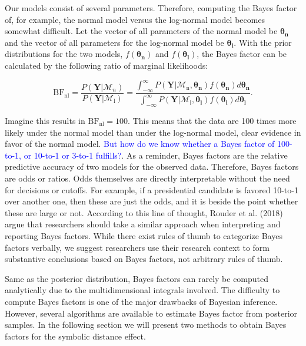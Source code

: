 \documentclass[
  english,
  doc,floatsintext]{apa6}
\begin{document}
Our models consist of several parameters. Therefore, computing the Bayes factor of, for example, the normal model versus the log-normal model becomes somewhat difficult. Let the vector of all parameters of the normal model be \(\bm{\theta_\text{n}}\) and the vector of all parameters for the log-normal model be \(\bm{\theta_{\text{l}}}\). With the prior distributions for the two models, \(f(\bm{\theta_\text{n}})\) and \(f(\bm{\theta_\text{l}})\), the Bayes factor can be calculated by the following ratio of marginal likelihoods:

\begin{equation}
\text{BF}_{\text{nl}} = \frac{P(\bm{Y} | \mathcal{M}_n)}{P(\bm{Y} | \mathcal{M}_{\text{l}})} = \frac{\int_{-\infty}^{\infty}P(\bm{Y} | \mathcal{M}_\text{n}, \bm{\theta_{\text{n}}})f(\bm{\theta_{\text{n}}})d\bm{\theta_{\text{n}}}}{\int_{-\infty}^{\infty}P(\bm{Y} | \mathcal{M}_\text{l}, \bm{\theta_{\text{l}}})f(\bm{\theta_{\text{l}}})d\bm{\theta_{\text{l}}}}. 
\end{equation}

Imagine this results in \(\text{BF}_{\text{nl}} = 100\). This means that the data are 100 times more likely under the normal model than under the log-normal model, clear evidence in favor of the normal model. \textcolor{blue}{But how do we know whether a Bayes factor of 100-to-1, or 10-to-1 or 3-to-1 fulfills?}. As a reminder, Bayes factors are the relative predictive accuracy of two models for the observed data. Therefore, Bayes factors are odds or ratios. Odds themselves are directly interpretable without the need for decisions or cutoffs. For example, if a presidential candidate is favored 10-to-1 over another one, then these are just the odds, and it is beside the point whether these are large or not. According to this line of thought, Rouder et al. (2018) argue that researchers should take a similar approach when interpreting and reporting Bayes factors. While there exist rules of thumb to categorize Bayes factors verbally, we suggest researchers use their research context to form substantive conclusions based on Bayes factors, not arbitrary rules of thumb.

Same as the posterior distribution, Bayes factors can rarely be computed analytically due to the multidimensional integrals involved. The difficulty to compute Bayes factors is one of the major drawbacks of Bayesian inference. However, several algorithms are available to estimate Bayes factor from posterior samples. In the following section we will present two methods to obtain Bayes factors for the symbolic distance effect.
\end{document}
